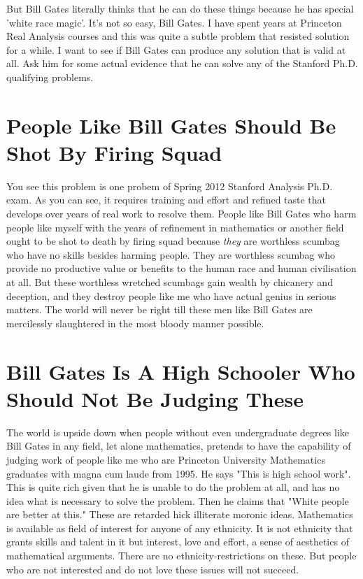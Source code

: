 \documentclass{amsart}
\begin{document}
But Bill Gates literally thinks that he can do these things because he has special 'white race magic'.  It's not so easy, Bill Gates.  I have spent years at Princeton Real Analysis courses and this was quite a subtle problem that resisted solution for a while.  I want to see if Bill Gates can produce any solution that is valid at all.  Ask him for some actual evidence that he can solve any of the Stanford Ph.D. qualifying problems.

\section{People Like Bill Gates Should Be Shot By Firing Squad}

You see this problem is one probem of Spring 2012 Stanford Analysis Ph.D. exam.  As you can see, it requires training and effort and refined taste that develops over years of real work to resolve them.  People like Bill Gates who harm people like myself with the years of refinement in mathematics or another field ought to be shot to death by firing squad because {\em they} are worthless scumbag who have no skills besides harming people.  They are worthless scumbag who provide no productive value or benefits to the human race and human civilisation at all.  But these worthless wretched scumbags gain wealth by chicanery and deception, and they destroy people like me who have actual genius in serious matters.  The world will never be right till these men like Bill Gates are mercilessly slaughtered in the most bloody manner possible.

\section{Bill Gates Is A High Schooler Who Should Not Be Judging These}

The world is upside down when people without even undergraduate degrees like Bill Gates in any field, let alone mathematics, pretends to have the capability of judging work of people like me who are Princeton University Mathematics graduates with magna cum laude from 1995.  He says "This is high school work".  This is quite rich given that he is unable to do the problem at all, and has no idea what is necessary to solve the problem.  Then he claims that "White people are better at this."  These are retarded hick illiterate moronic ideas.  Mathematics is available as field of interest for anyone of any ethnicity.  It is not ethnicity that grants skills and talent in it but interest, love and effort, a sense of aesthetics of mathematical arguments.  There are no ethnicity-restrictions on these.  But people who are not interested and do not love these issues will not succeed.  
\end{document}

